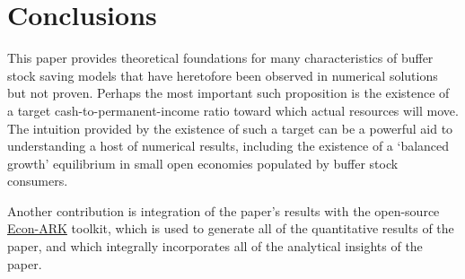 \documentclass[BufferStockTheory]{subfiles}
\begin{document}
\hypertarget{Conclusions}{}
\section{Conclusions}

This paper provides theoretical foundations for many characteristics
of buffer stock saving models that have heretofore been observed in
numerical solutions but not proven.  Perhaps the most important such
proposition is the existence of a target cash-to-permanent-income
ratio toward which actual resources will move.  The intuition provided by
the existence of such a target can be a powerful aid to understanding a host
of numerical results, including the existence of a `balanced growth' equilibrium in small open economies
populated by buffer stock consumers.

Another contribution is integration of the paper's results with the open-source \href{https://econ-ark.org}{Econ-ARK} toolkit, which is used to generate all of the quantitative results of the paper, and which integrally incorporates all of the analytical insights of the paper.

\begin{equation*}
  \label{eq:Dummy}
\end{equation*}

\clearpage\vfill\eject

\onlyinsubfile{}
\end{document}
